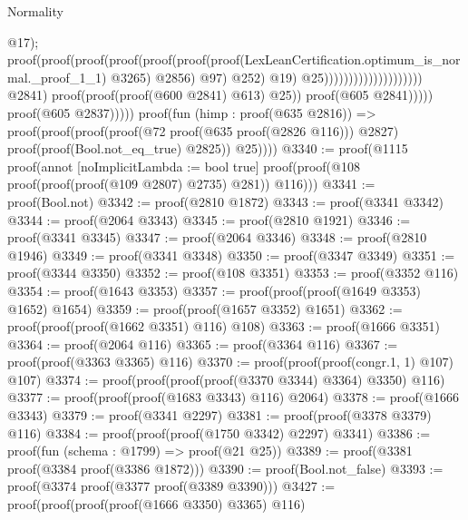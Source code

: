 \begin{lexlean}{Normality}
\begin{coremodule}
                                                                                      @17);
                                                                                  proof(proof(proof(proof(proof(proof(proof(LexLeanCertification.optimum_is_normal._proof_1_1)
                                                                                                @3265)
                                                                                              @2856)
                                                                                            @97)
                                                                                          @252)
                                                                                        @19)
                                                                                      @25))))))))))))))))))))
                                  @2841)
                                proof(proof(proof(@600 @2841) @613) @25))
                              proof(@605 @2841)))))
                    proof(@605 @2837)))))
        proof(fun (himp : proof(@635 @2816)) =>
          proof(proof(proof(proof(@72 proof(@635 proof(@2826 @116))) @2827)
                proof(proof(Bool.not_eq_true) @2825))
              @25))))
@3340 := proof(@1115
      proof(annot [noImplicitLambda := bool true]
        proof(proof(@108 proof(proof(proof(@109 @2807) @2735) @281)) @116)))
@3341 := proof(Bool.not)
@3342 := proof(@2810 @1872)
@3343 := proof(@3341 @3342)
@3344 := proof(@2064 @3343)
@3345 := proof(@2810 @1921)
@3346 := proof(@3341 @3345)
@3347 := proof(@2064 @3346)
@3348 := proof(@2810 @1946)
@3349 := proof(@3341 @3348)
@3350 := proof(@3347 @3349)
@3351 := proof(@3344 @3350)
@3352 := proof(@108 @3351)
@3353 := proof(@3352 @116)
@3354 := proof(@1643 @3353)
@3357 := proof(proof(proof(@1649 @3353) @1652) @1654)
@3359 := proof(proof(@1657 @3352) @1651)
@3362 := proof(proof(proof(@1662 @3351) @116) @108)
@3363 := proof(@1666 @3351)
@3364 := proof(@2064 @116)
@3365 := proof(@3364 @116)
@3367 := proof(proof(@3363 @3365) @116)
@3370 := proof(proof(proof(congr.{1, 1}) @107) @107)
@3374 := proof(proof(proof(proof(@3370 @3344) @3364) @3350) @116)
@3377 := proof(proof(proof(@1683 @3343) @116) @2064)
@3378 := proof(@1666 @3343)
@3379 := proof(@3341 @2297)
@3381 := proof(proof(@3378 @3379) @116)
@3384 := proof(proof(proof(@1750 @3342) @2297) @3341)
@3386 := proof(fun (schema : @1799) => proof(@21 @25))
@3389 := proof(@3381 proof(@3384 proof(@3386 @1872)))
@3390 := proof(Bool.not_false)
@3393 := proof(@3374 proof(@3377 proof(@3389 @3390)))
@3427 := proof(proof(proof(proof(@1666 @3350) @3365) @116)

\end{coremodule}
\end{lexlean}
